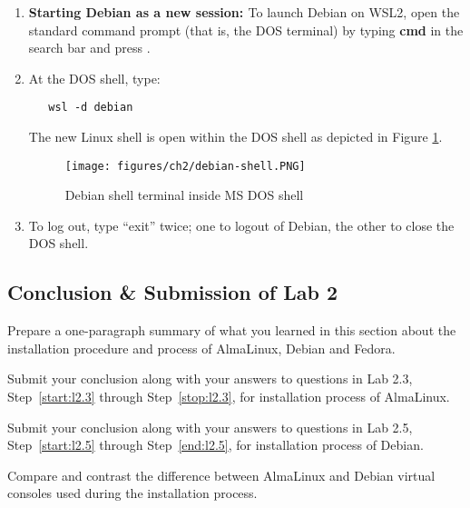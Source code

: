 \begin{enumerate}
\item {\bf{Starting Debian as a new session: }} To launch Debian on WSL2, open the standard command prompt (that is, the DOS terminal) by typing {\bf{cmd}} in the search bar and press {}. 

\item At the DOS shell, type: 
\begin{verbatim}
   wsl -d debian 
\end{verbatim}
The new Linux shell is open within the DOS shell as depicted in Figure \ref{fig:debian-shell}. 
\begin{figure}[hbt!]\centering
\texttt{[image: figures/ch2/debian-shell.PNG]}
\caption{Debian shell terminal inside MS DOS shell} \label{fig:debian-shell} %
\end{figure}

\item To log out, type ``exit'' twice; one to logout of Debian, the other to close the DOS shell. 

\end{enumerate}  

\subsection*{Conclusion \& Submission of Lab 2}

Prepare a one-paragraph summary of what you learned in this section about the installation procedure and process of AlmaLinux, Debian and Fedora.  

Submit your conclusion along with your answers to questions in Lab 2.3, Step~\ref{start:l2.3} through Step~\ref{stop:l2.3}, for installation process of AlmaLinux.

Submit your conclusion along with your answers to questions in Lab 2.5, Step~\ref{start:l2.5} through Step~\ref{end:l2.5}, for installation process of Debian. 

Compare and contrast the difference between AlmaLinux and Debian virtual consoles used during the installation process. 
